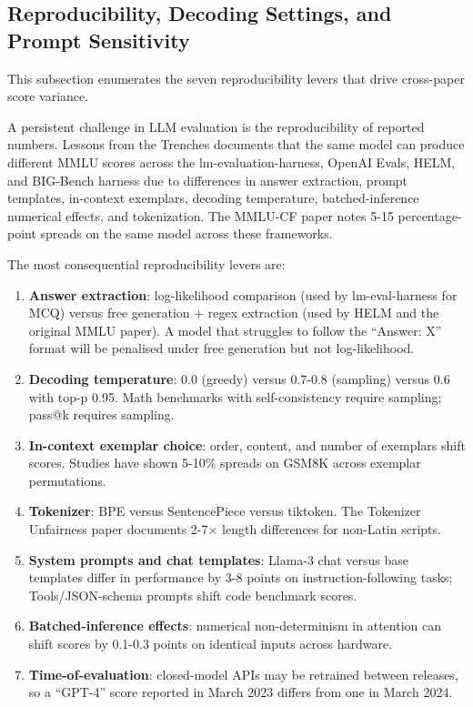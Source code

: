 \documentclass{article}
\begin{document}
\subsection{Reproducibility, Decoding Settings, and Prompt Sensitivity}\label{reproducibility-decoding-settings-and-prompt-sensitivity}

This subsection enumerates the seven reproducibility levers that drive cross-paper score variance.

A persistent challenge in LLM evaluation is the reproducibility of reported numbers. Lessons from the Trenches \cite{biderman20242024} documents that the same model can produce different MMLU scores across the lm-evaluation-harness, OpenAI Evals, HELM, and BIG-Bench harness due to differences in answer extraction, prompt templates, in-context exemplars, decoding temperature, batched-inference numerical effects, and tokenization. The MMLU-CF paper \cite{zhao20242024} notes 5-15 percentage-point spreads on the same model across these frameworks.

The most consequential reproducibility levers are:

\begin{enumerate}
\def\labelenumi{\arabic{enumi}.}

\item
  \textbf{Answer extraction}: log-likelihood comparison (used by lm-eval-harness for MCQ) versus free generation + regex extraction (used by HELM and the original MMLU paper). A model that struggles to follow the ``Answer: X'' format will be penalised under free generation but not log-likelihood.
\item
  \textbf{Decoding temperature}: 0.0 (greedy) versus 0.7-0.8 (sampling) versus 0.6 with top-p 0.95. Math benchmarks with self-consistency require sampling; pass@k requires sampling.
\item
  \textbf{In-context exemplar choice}: order, content, and number of exemplars shift scores. Studies have shown 5-10\% spreads on GSM8K across exemplar permutations.
\item
  \textbf{Tokenizer}: BPE versus SentencePiece versus tiktoken. The Tokenizer Unfairness paper \cite{petrov20232023} documents 2-7× length differences for non-Latin scripts.
\item
  \textbf{System prompts and chat templates}: Llama-3 chat versus base templates differ in performance by 3-8 points on instruction-following tasks; Tools/JSON-schema prompts shift code benchmark scores.
\item
  \textbf{Batched-inference effects}: numerical non-determinism in attention can shift scores by 0.1-0.3 points on identical inputs across hardware.
\item
  \textbf{Time-of-evaluation}: closed-model APIs may be retrained between releases, so a ``GPT-4'' score reported in March 2023 differs from one in March 2024.
\end{enumerate}
\end{document}
